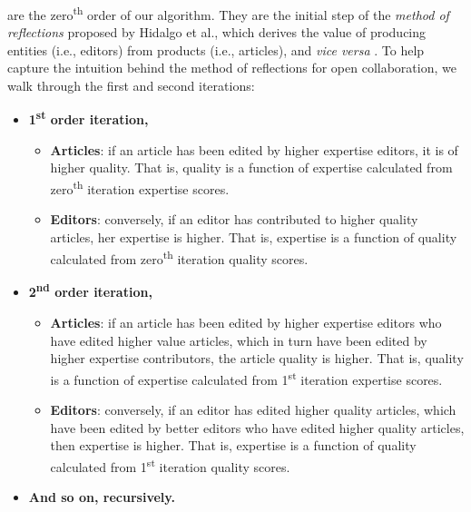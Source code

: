 are the zero\textsuperscript{th} order of our algorithm. They are the initial step of the {\it method of reflections} proposed by Hidalgo et al., which derives the value of producing entities (i.e., editors) from products (i.e., articles), and {\it vice versa} \cite{hidalgo2007,hidalgo2009}. To help capture the intuition behind the method of reflections for open collaboration, we walk through the first and second iterations:

\begin{itemize}
  \item {\bf 1\textsuperscript{st} order iteration,}  
  \begin{itemize}
  \item {\bf Articles}: if an article has been edited by higher expertise editors, it is of higher quality. That is, quality is a function of expertise calculated from zero\textsuperscript{th} iteration expertise scores.
  \item {\bf Editors}: conversely, if an editor has contributed to higher quality articles, her expertise is higher. That is, expertise is a function of quality calculated from zero\textsuperscript{th} iteration quality scores.
  \end{itemize}
  \item {\bf 2\textsuperscript{nd} order iteration,}
    \begin{itemize}
  \item {\bf Articles}: if an article has been edited by higher expertise editors who have edited higher value articles, which in turn have been edited by higher expertise contributors, the article quality is higher. That is, quality is a function of expertise calculated from 1\textsuperscript{st} iteration expertise scores.
  \item {\bf Editors}: conversely, if an editor has edited higher quality articles, which have been edited by better editors who have edited higher quality articles, then expertise is higher. That is, expertise is a function of quality calculated from 1\textsuperscript{st} iteration quality scores.
  \end{itemize}
 \item {\bf And so on, recursively.}\\
\end{itemize}

